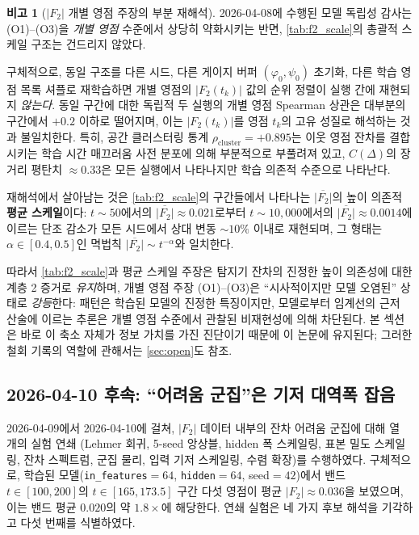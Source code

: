 \documentclass[11pt, a4paper]{article}
\theoremstyle{definition}
\newtheorem{remark}{비고}[section]
\theoremstyle{plain}
\begin{document}
\begin{remark}[$|F_2|$ 개별 영점 주장의 부분 재해석]
\label{rem:f2_reinterp}
2026-04-08에 수행된 모델 독립성 감사는 (O1)--(O3)을 \emph{개별 영점} 수준에서 상당히 약화시키는 반면, \cref{tab:f2_scale}의 총괄적 스케일 구조는 건드리지 않았다.

구체적으로, 동일 구조를 다른 시드, 다른 게이지 버퍼 $(\varphi_0,\psi_0)$ 초기화, 다른 학습 영점 목록 셔플로 재학습하면 개별 영점의 $|F_2(t_k)|$ 값의 순위 정렬이 실행 간에 재현되지 \emph{않는다}. 동일 구간에 대한 독립적 두 실행의 개별 영점 Spearman 상관은 대부분의 구간에서 $+0.2$ 이하로 떨어지며, 이는 $|F_2(t_k)|$를 영점 $t_k$의 고유 성질로 해석하는 것과 불일치한다. 특히, 공간 클러스터링 통계 $\rho_{\mathrm{cluster}}=+0.895$는 이웃 영점 잔차를 결합시키는 학습 시간 매끄러움 사전 분포에 의해 부분적으로 부풀려져 있고, $C(\Delta)$의 장거리 평탄치 $\approx 0.33$은 모든 실행에서 나타나지만 학습 의존적 수준으로 나타난다.

재해석에서 살아남는 것은 \cref{tab:f2_scale}의 구간들에서 나타나는 $\overline{|F_2|}$의 높이 의존적 \textbf{평균 스케일}이다: $t\sim 50$에서의 $\overline{|F_2|}\approx 0.021$로부터 $t\sim 10{,}000$에서의 $\overline{|F_2|}\approx 0.0014$에 이르는 단조 감소가 모든 시드에서 상대 변동 ${\sim}10\%$ 이내로 재현되며, 그 형태는 $\alpha\in[0.4,0.5]$인 멱법칙 $\overline{|F_2|}\sim t^{-\alpha}$와 일치한다.

따라서 \cref{tab:f2_scale}과 평균 스케일 주장은 탐지기 잔차의 진정한 높이 의존성에 대한 계층 2 증거로 \emph{유지}하며, 개별 영점 주장 (O1)--(O3)은 ``시사적이지만 모델 오염된'' 상태로 \emph{강등}한다: 패턴은 학습된 모델의 진정한 특징이지만, 모델로부터 임계선의 근저 산술에 이르는 추론은 개별 영점 수준에서 관찰된 비재현성에 의해 차단된다. 본 섹션은 바로 이 축소 자체가 정보 가치를 가진 진단이기 때문에 이 논문에 유지된다; 그러한 철회 기록의 역할에 관해서는 \cref{sec:open}도 참조.
\end{remark}

\subsection{2026-04-10 후속: ``어려움 군집''은 기저 대역폭 잡음}
\label{sec:f2_residual_cluster_artifact}

2026-04-09에서 2026-04-10에 걸쳐, $|F_2|$ 데이터 내부의 잔차 어려움 군집에 대해 열 개의 실험 연쇄 (Lehmer 회귀, 5-seed 앙상블, hidden 폭 스케일링, 표본 밀도 스케일링, 잔차 스펙트럼, 군집 물리, 입력 기저 스케일링, 수렴 확장)를 수행하였다. 구체적으로, 학습된 모델(\texttt{in\_features}$=64$, \texttt{hidden}$=64$, seed$=42$)에서 밴드 $t\in[100,200]$의 $t\in[165,173.5]$ 구간 다섯 영점이 평균 $|F_2|\approx 0.036$을 보였으며, 이는 밴드 평균 $0.020$의 약 $1.8\times$에 해당한다. 연쇄 실험은 네 가지 후보 해석을 기각하고 다섯 번째를 식별하였다.
\end{document}
